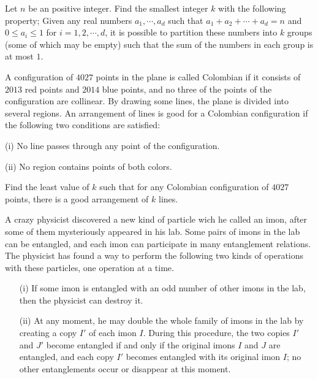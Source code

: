 \item[\textbf{C1.}]
Let 
$n$
 be an positive integer. Find the smallest integer 
$k$
 with the following property; Given any real numbers 
$a_1 , \cdots , a_d $
 such that 
$a_1 + a_2 + \cdots + a_d = n$
 and 
$0 \le a_i \le 1$
 for 
$i=1,2,\cdots ,d$, 
 it is possible to partition these numbers into 
$k$
 groups (some of which may be empty) such that the sum of the numbers in each group is at most 
$1$.

\item[\textbf{C2.}]
A configuration of 
$4027$
 points in the plane is called Colombian if it consists of 
$2013$
 red points and 
$2014$
 blue points, and no three of the points of the configuration are collinear. By drawing some lines, the plane is divided into several regions. An arrangement of lines is good for a Colombian configuration if the following two conditions are satisfied:


(i) No line passes through any point of the configuration.


(ii) No region contains points of both colors.


Find the least value of 
$k$
 such that for any Colombian configuration of 
$4027$
 points, there is a good arrangement of 
$k$
 lines.

\item[\textbf{C3.}]
A crazy physicist discovered a new kind of particle wich he called an imon, after some of them mysteriously appeared in his lab. Some pairs of imons in the lab can be entangled, and each imon can participate in many entanglement relations. The physicist has found a way to perform the following two kinds of operations with these particles, one operation at a time.

\begin{itemize}

\item[(i)] If some imon is entangled with an odd number of other imons in the lab, then the physicist can destroy it.


\item[(ii)] At any moment, he may double the whole family of imons in the lab by creating a copy 
$I'$
 of each imon 
$I$.
 During this procedure, the two copies 
$I'$
 and 
$J'$
 become entangled if and only if the original imons 
$I$
 and 
$J$
 are entangled, and each copy 
$I'$
 becomes entangled with its original imon 
$I$;
 no other entanglements occur or disappear at this moment.

\end{itemize}

